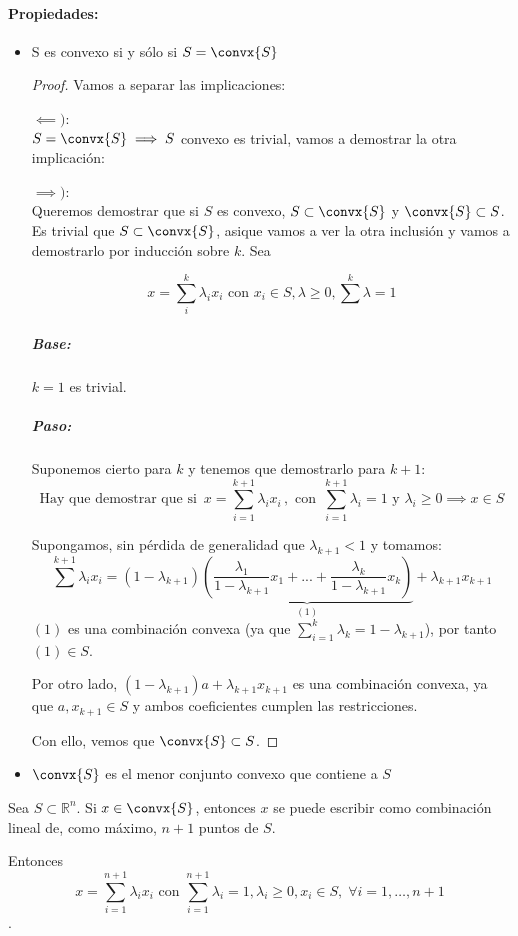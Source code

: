 \paragraph{Propiedades:}
\begin{itemize}
\item  S es convexo si y sólo si $S = \convx{S}$

\begin{proof} Vamos a separar las implicaciones:


$\impliedby)$:\\ $S = \convx{S} \implies S$ convexo es trivial, vamos a demostrar la otra implicación:

$\implies)$:\\ Queremos demostrar que si $S$ es convexo, $S\subset \convx{S}$ y $\convx{S}\subset S$. Es trivial que $S\subset\convx{S}$, asique vamos a ver la otra inclusión y vamos a demostrarlo por inducción sobre $k$. Sea

\[x = \sum_i^k λ_ix_i \text{ con } x_i \in S,λ\geq 0, \sum^k λ = 1\]

\subparagraph{Base:} $k=1$ es trivial.

\subparagraph{Paso:}Suponemos cierto para $k$ y tenemos que demostrarlo para $k+1$: \[\text{Hay que demostrar que si }\, x=\sum_{i=1}^{k+1} \lambda_i x_i \,, \text{ con }\,\sum_{i=1}^{k+1} \lambda_i = 1 \text{ y }\lambda_i \geq 0 \implies x \in S\]

Supongamos, sin pérdida de generalidad que $λ_{k+1} < 1$ y tomamos:
\[\sum^{k+1} λ_ix_i = (1-λ_{k+1})\underbrace{\left(\frac{λ_1}{1-λ_{k+1}}x_1 + ... + \frac{λ_k}{1-λ_{k+1}}x_k \right)}_{(1)}+λ_{k+1}x_{k+1}\]
$(1)$ es una combinación convexa (ya que $\sum_{i=1}^{k}\lambda_k = 1 - \lambda_{k+1}$), por tanto $(1)\in S$.

Por otro lado, $(1-λ_{k+1})a + λ_{k+1}x_{k+1}$ es una combinación convexa, ya que $a,x_{k+1}\in S$ y ambos coeficientes cumplen las restricciones.

Con ello, vemos que $\convx{S}\subset S$.
\end{proof}


\item $\convx{S}$ es el menor conjunto convexo que contiene a $S$

\end{itemize}


\begin{theorem}
Sea $S\subset \mathbb{R}^n$. Si $x\in\convx{S}$, entonces $x$ se puede escribir como combinación lineal de, como máximo, $n+1$ puntos de $S$.


Entonces \[x=\sum_{i=1}^{n+1}\lambda_i x_i\text{ con }\sum_{i=1}^{n+1}\lambda_i=1, \lambda_i\geq 0, x_i\in S,\; \forall i=1,\ldots, n+1\].
\end{theorem}

